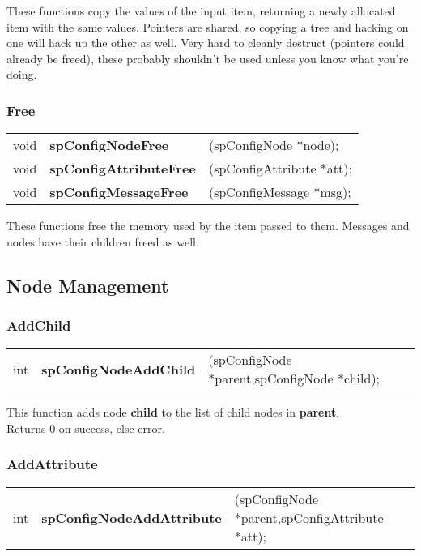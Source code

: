 \documentclass[10pt]{article}
\begin{document}
\noindent These functions copy the values of the input item, returning a newly
allocated  item with the same values. Pointers are shared, so copying a tree
and hacking on one  will hack up the other as well.  Very hard to cleanly
destruct (pointers could already  be freed), these probably shouldn't be used
unless you know what you're doing.

\subsubsection*{Free}
\noindent\begin{tabular}{l l l @{}}
void&\textbf{spConfigNodeFree}&(spConfigNode *node);\\
void&\textbf{spConfigAttributeFree}&(spConfigAttribute *att);\\
void&\textbf{spConfigMessageFree}&(spConfigMessage *msg);\\
\end{tabular}

\noindent These functions free the memory used by the item passed to them. 
Messages and nodes have their children freed as well.




\subsection{Node Management}

\subsubsection*{AddChild}
\noindent\begin{tabular}{l l l @{}}
int&\textbf{spConfigNodeAddChild}&(spConfigNode *parent,spConfigNode *child);\\
\end{tabular}

\noindent This function adds node \textbf{child} to the list of child nodes in
\textbf{parent}.\\ Returns 0 on success, else error.

\subsubsection*{AddAttribute}
\noindent\begin{tabular}{l l l @{}}
int&\textbf{spConfigNodeAddAttribute}&(spConfigNode *parent,spConfigAttribute *att);\\
\end{tabular}
\end{document}
